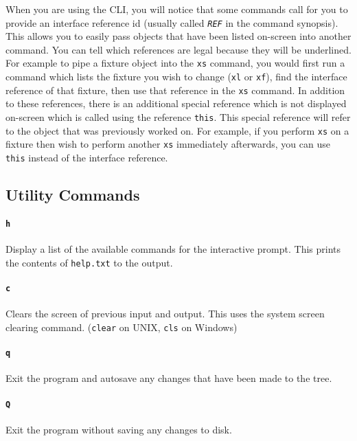 \documentclass[a4paper]{article}
\begin{document}
When you are using the CLI, you will notice that some commands call for you 
to provide an interface reference id (usually called \texttt{\textit{REF}} 
in the command synopsis). This allows you to easily pass objects that have 
been listed on-screen into another command. You can tell which references are 
legal because they will be underlined. For example to pipe a fixture object 
into the \texttt{xs} command, you would first run a command which lists the 
fixture you wish to change (\texttt{xl} or \texttt{xf}), find the interface 
reference of that fixture, then use that reference in the \texttt{xs} 
command. In addition to these references, there is an additional special 
reference which is not displayed on-screen which is called using the 
reference \texttt{this}. This special reference will refer to the object that 
was previously worked on. For example, if you perform \texttt{xs} on a fixture 
then wish to perform another \texttt{xs} immediately afterwards, you can use 
\texttt{this} instead of the interface reference.

\subsection{Utility Commands}

\paragraph{\texttt{h}}
Display a list of the available commands for the interactive prompt. This 
prints the contents of \texttt{help.txt}  to the output.

\paragraph{\texttt{c}}
Clears the screen of previous input and output. This uses the system screen 
clearing command. (\texttt{clear} on UNIX, \texttt{cls} on Windows)

\paragraph{\texttt{q}}
Exit the program and autosave any changes that have been made to the tree.

\paragraph{\texttt{Q}}
Exit the program without saving any changes to disk.
\end{document}
